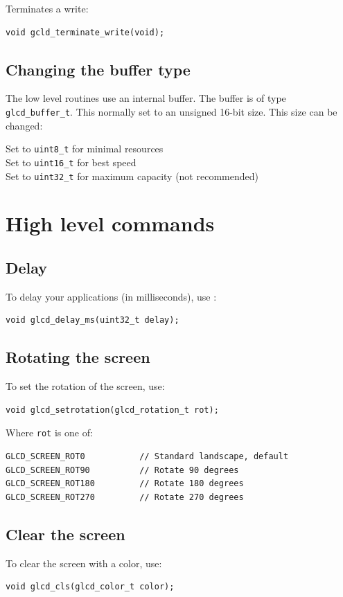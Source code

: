 \documentclass[12pt]{article}
\begin{document}
Terminates a write:
\begin{lstlisting}
void gcld_terminate_write(void);
\end{lstlisting}

\subsection{Changing the buffer type}
The low level routines use an internal buffer. The buffer is of type \lstinline|glcd_buffer_t|. This normally set to an unsigned 16-bit size. This size can be changed:

Set to \lstinline|uint8_t| for minimal resources\\
Set to \lstinline|uint16_t| for best speed\\
Set to \lstinline|uint32_t| for maximum capacity (not recommended)
 
\section{High level commands}

\subsection{Delay}

To delay your applications (in milliseconds), use :
\begin{lstlisting}
void glcd_delay_ms(uint32_t delay);
\end{lstlisting}

\subsection{Rotating the screen}
To set the rotation of the screen, use:
\begin{lstlisting}
void glcd_setrotation(glcd_rotation_t rot);
\end{lstlisting}

Where \lstinline|rot| is one of:

\begin{lstlisting}
GLCD_SCREEN_ROT0           // Standard landscape, default
GLCD_SCREEN_ROT90          // Rotate 90 degrees
GLCD_SCREEN_ROT180         // Rotate 180 degrees
GLCD_SCREEN_ROT270         // Rotate 270 degrees
\end{lstlisting}

\subsection{Clear the screen}
To clear the screen with a color, use:
\begin{lstlisting}
void glcd_cls(glcd_color_t color);
\end{lstlisting}
\end{document}
